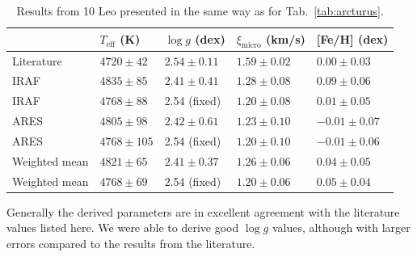 \documentclass{aa}
\begin{document}
\begin{table}[htb!]
    \caption{Results from 10 Leo presented in the same way as for
             Tab.~\ref{tab:arcturus}.}
    \label{tab:10Leo}
    \centering
    \begin{tabular}{lllll}
      \hline\hline
                      & $T_\mathrm{eff}$ (K) &  $\log g$ (dex)  &   $\xi_\mathrm{micro}$ (km/s)   & [Fe/H] (dex)     \\
      \hline
        Literature    & $4720 \pm  42$       &  $2.54 \pm 0.11$ &    $1.59 \pm 0.02$              & $ 0.00 \pm 0.03$ \\
      \hline
        IRAF          & $4835 \pm  85$       &  $2.41 \pm 0.41$ &    $1.28 \pm 0.08$              & $ 0.09 \pm 0.06$ \\
        IRAF          & $4768 \pm  88$       &   2.54 (fixed)   &    $1.20 \pm 0.08$              & $ 0.01 \pm 0.05$ \\
      \hline
        ARES          & $4805 \pm  98$       &  $2.42 \pm 0.61$ &    $1.23 \pm 0.10$              & $-0.01 \pm 0.07$ \\
        ARES          & $4768 \pm 105$       &   2.54 (fixed)   &    $1.20 \pm 0.10$              & $-0.01 \pm 0.06$ \\
      \hline
        Weighted mean & $4821 \pm  65$       &  $2.41 \pm 0.37$ &    $1.26 \pm 0.06$              & $ 0.04 \pm 0.05$ \\
        Weighted mean & $4768 \pm  69$       &   2.54 (fixed)   &    $1.20 \pm 0.06$              & $ 0.05 \pm 0.04$ \\
      \hline
    \end{tabular}
\end{table}

Generally the derived parameters are in excellent agreement with the literature
values listed here. We were able to derive good $\log g$ values, although with
larger errors compared to the results from the literature.
\end{document}
